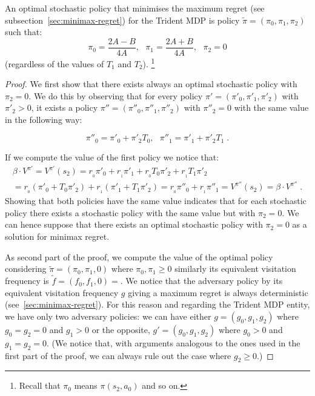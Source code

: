 \begin{proposition}\label{theorem:opt_stoc}
An optimal stochastic policy that minimises the maximum regret (see subsection~\ref{sec:minimax-regret}) for the Trident MDP is policy $\tilde{\pi} = (\pi_0, \pi_1, \pi_2)$ such that:
$$\pi_{0}=\dfrac{2A - B}{4A},~~~\pi_{1}=\dfrac{2A + B}{4A}, ~~~\pi_2 = 0$$
(regardless of the values of $T_1$ and $T_2$). \footnote{Recall that $\pi_0$ means $\pi(s_2, a_0)$ and so on.}
\end{proposition}
\begin{proof}
We first show that there exists always an optimal stochastic policy with $\pi_2 = 0$. We do this by observing that for every policy $\pi' = (\pi'_0, \pi'_1, \pi'_2)$ with $\pi'_2 > 0$, it exists a policy $\pi'' = (\pi''_0, \pi''_1, \pi''_2)$ with $\pi''_2 = 0$ with the same value in the following way:

$$\pi''_0 = \pi'_0 + \pi'_2 T_0, ~~~ \pi''_1 = \pi'_1 + \pi'_2 T_1\;.$$

If we compute the value of the first policy we notice that:
\begin{align*}
\beta \cdot V^{\pi'} = V^{\pi'}(s_2) =
r_{_0} \pi'_0 + r_{_1}\pi'_1 + r_{_0} T_0 \pi'_2 + r_{_1} T_1 \pi'_2 \\
= r_{_0} (\pi'_0 + T_0 \pi'_2) + r_{_1} (\pi'_1 + T_1 \pi'_2)
= r_{_0} \pi''_0 + r_{_1}\pi''_1 = V^{\pi''}(s_2) =\beta \cdot V^{\pi''}\;.
\end{align*}
Showing that both policies have the same value indicates that for each stochastic policy there exists a stochastic policy with the same value but with $\pi_2 = 0$. We can hence suppose that there exists an optimal stochastic policy with $\pi_2 =0$ as a solution for minimax regret. 

As second part of the proof, we compute the value of the optimal policy considering $\tilde{\pi} = (\pi_0, \pi_1, 0)$ where $\pi_0, \pi_1 \geq 0$ similarly its equivalent visitation frequency is $\tilde{f} = (f_0, f_1, 0) =$. 
We notice that the adversary policy by its equivalent visitation frequency $g$ giving a maximum regret is always deterministic (see~\ref{sec:minimax-regret}). For this reason and regarding the Trident MDP entity, we have only two adversary policies: we can have either $g = (g_0, g_1, g_2)$ where $g_0 = g_2=0$ and $g_1 > 0$ or the opposite, $g' = (g_0, g_1, g_2)$ where $g_0>0$ and $g_1 = g_2 = 0$. (We notice that, with arguments analogous to the ones used in the first part of the proof, we can always rule out the case where $g_2 \geq 0$.)


\end{proof}
